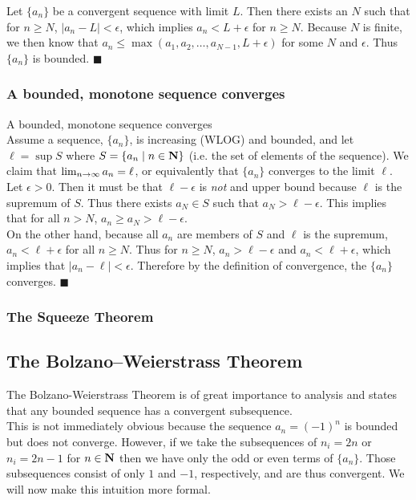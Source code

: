     \pf Let $\{a_n\}$ be a convergent sequence with limit $L$. Then there exists an $N$ such that
    for $n \geq N$, $|a_n- L| < \epsilon$, which implies $a_n < L + \epsilon$ for $n \geq N$. 
    Because $N$ is finite, we then know that $a_n \leq \max(a_1,a_2,\ldots,a_{N-1},L+\epsilon)$ 
    for some $N$ and $\epsilon$. Thus $\{a_n\}$ is bounded. $\blacksquare$
  \subsubsection{A bounded, monotone sequence converges}
    \thm A bounded, monotone sequence converges\\

    \pf Assume a sequence, $\{a_n\}$, is increasing (WLOG) and bounded, and let $\ell = \sup S$
    where $S = \{a_n \mid n \in \mathbf{N}\}$ (i.e. the set of elements of the sequence). We claim
    that $\lim_{n \to \infty} a_n = \ell$, or equivalently that $\{a_n\}$ converges to the limit $\ell$.\\

    Let $\epsilon > 0$. Then it must be that $\ell - \epsilon$ is \emph{not} and upper bound 
    because $\ell$ is the supremum of $S$. Thus there exists $a_N \in S$ such that $a_N > \ell
    - \epsilon$. This implies that for all $n > N$, $a_n \geq a_N > \ell - \epsilon$.\\

    On the other hand, because all $a_n$ are members of $S$ and $\ell$ is the supremum, $a_n < 
    \ell + \epsilon$ for all $n \geq N$. Thus for $n \geq N$, $a_n > \ell - \epsilon$ and $a_n
    < \ell + \epsilon$, which implies that $|a_n - \ell| < \epsilon$. Therefore by the definition 
    of convergence, the $\{a_n\}$ converges. $\blacksquare$
  \subsubsection{The Squeeze Theorem}

  \subsection{The Bolzano--Weierstrass Theorem}
    The Bolzano-Weierstrass Theorem is of great importance to analysis and states that any 
    bounded sequence has a convergent subsequence.\\
    
    This is not immediately obvious because the sequence $a_n = (-1)^n$ is bounded but does not 
    converge. However, if we take the subsequences of $n_i = 2n$ or $n_i = 2n-1$ for $n \in 
    \mathbf{N}$ then we have only the odd or even terms of $\{a_n\}$. Those subsequences consist 
    of only $1$ and $-1$, respectively, and are thus convergent. We will now make this intuition
    more formal.\\

